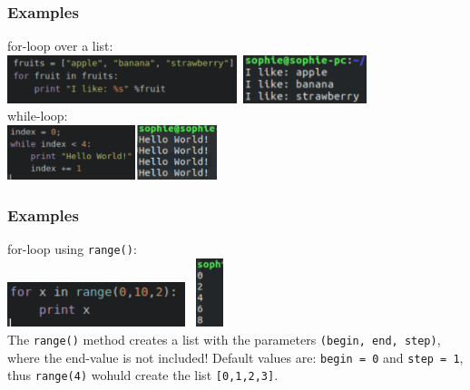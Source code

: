 \documentclass{beamer}
\begin{document}
\begin{frame}
\frametitle{Examples}
	
	for-loop over a list:\\
		\includegraphics[height = 1.4cm]{forLoop.pdf} $\,$\includegraphics[height = 1.4cm]{forLoop_Output.pdf}\\
	while-loop: \\
		\includegraphics[height = 1.6cm]{whileLoop.pdf}$\,$\includegraphics[height = 1.6cm]{whileLoop_Output.pdf}
	
\end{frame}
\begin{frame}
\frametitle{Examples}
	
	for-loop using \texttt{range()}:\\
		\includegraphics[height = 1.3cm]{forLoopRange.pdf} $\,$
		\includegraphics[height = 2cm]{forLoopRange_Output.pdf} \\
	The \texttt{range()} method creates a list with the parameters \texttt{(begin, end, step)}, where the end-value is not included! Default values are: \texttt{begin = 0} and \texttt{step = 1}, thus \texttt{range(4)} wohuld create the list \texttt{[0,1,2,3]}.
		
	
\end{frame}
\end{document}
